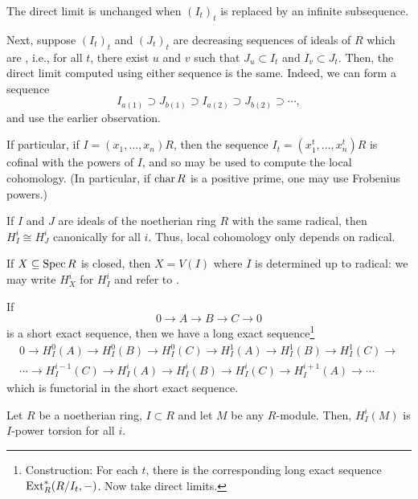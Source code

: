 \documentclass[12pt]{article}
\begin{document}
\begin{obs}
	The direct limit is unchanged when $(I_{t})_{t}$ is replaced by an infinite subsequence.

	Next, suppose $(I_{t})_{t}$ and $(J_{t})_{t}$ are decreasing sequences of ideals of $R$ which are , i.e., for all $t$, there exist $u$ and $v$ such that $J_{u} \subset I_{t}$ and $I_{v} \subset J_{t}$. Then, the direct limit computed using either sequence is the same. Indeed, we can form a sequence
	\begin{equation*} 
		I_{a(1)} \supset J_{b(1)} \supset I_{a(2)} \supset J_{b(2)} \supset \cdots,
	\end{equation*}
	and use the earlier observation.

	If particular, if $I = (x_{1}, \ldots, x_{n}) R$, then the sequence $I_{t} = (x_{1}^{t}, \ldots, x_{n}^{t}) R$ is cofinal with the powers of $I$, and so may be used to compute the local cohomology. (In particular, if $\operatorname{char} R$ is a positive prime, one may use Frobenius powers.)
\end{obs}

\begin{cor}
	If $I$ and $J$ are ideals of the noetherian ring $R$ with the same radical, then $H_{I}^{i} \cong H_{J}^{i}$ canonically for all $i$. \newline
	Thus, local cohomology only depends on radical.
\end{cor}
If $X \subseteq \operatorname{Spec} R$ is closed, then $X = V(I)$ where $I$ is determined up to radical: we may write $H_{X}^{i}$ for $H_{I}^{i}$ and refer to .

If 
\begin{equation*} 
	0 \to A \to B \to C \to 0
\end{equation*}
is a short exact sequence, then we have a long exact sequence\footnote{Construction: For each $t$, there is the corresponding long exact sequence $\operatorname{Ext}_{R}^{\ast}(R/I_{t}, -)$. Now take direct limits.}
\begin{align*} 
	0 \to H_{I}^{0}(A) \to H_{I}^{0}(B) \to H_{I}^{0}(C) \to H_{I}^{1}(A) \to H_{I}^{1}(B) \to H_{I}^{1}(C) \to \\
	\cdots \to H_{I}^{i - 1}(C) \to H_{I}^{i}(A) \to H_{I}^{i}(B) \to H_{I}^{i}(C) \to H_{I}^{i + 1}(A) \to \cdots
\end{align*}
which is functorial in the short exact sequence.

\begin{prop}
	Let $R$ be a noetherian ring, $I \subset R$ and let $M$ be any $R$-module. Then, $H_{I}^{i}(M)$ is $I$-power torsion for all $i$.
\end{prop}
\end{document}
